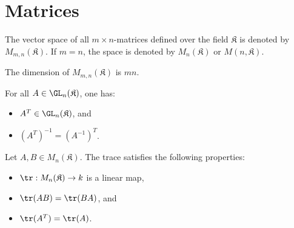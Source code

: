 \section{Matrices}

    \begin{notation}\label{linalgebra:matrix_set}
        The vector space of all $m\times n$-matrices defined over the field $\mathfrak{K}$ is denoted by $M_{m,n}(\mathfrak{K})$. If $m=n$, the space is denoted by $M_n(\mathfrak{K})$ or $M(n,\mathfrak{K})$.
    \end{notation}

    \begin{property}[Dimension]\label{linalgebra:dimension_of_matrix_space}
        The dimension of $M_{m,n}(\mathfrak{K})$ is $mn$.
    \end{property}

    \begin{property}
        For all $A\in\GL_n(\mathfrak{K})$, one has:
        \begin{itemize}
            \item $A^T\in\GL_n(\mathfrak{K})$, and
            \item $\left(A^T\right)^{-1}=\left(A^{-1}\right)^T$.
        \end{itemize}
    \end{property}

    \begin{property}\label{linalgebra:trace_commutative}
        Let $A,B\in M_n(\mathfrak{K})$. The trace satisfies the following properties:
        \begin{itemize}
            \item $\tr:M_n(\mathfrak{K})\rightarrow k$ is a linear map,
            \item $\tr(AB) = \tr(BA)$, and
            \item $\tr(A^T) = \tr(A)$.
        \end{itemize}
    \end{property}

